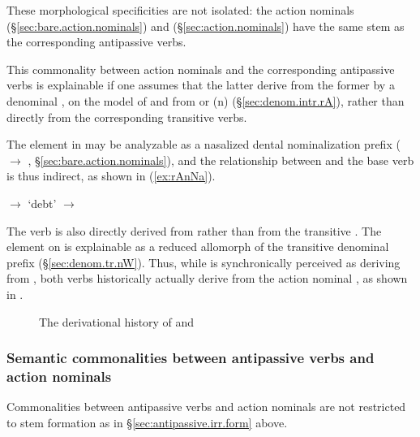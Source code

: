 These morphological specificities are not isolated: the action nominals   (§\ref{sec:bare.action.nominals}) and   (§\ref{sec:action.nominals}) have the same stem as the corresponding antipassive verbs.

This commonality between action nominals and the corresponding antipassive verbs is explainable if one assumes that the latter derive from the former by a denominal , on the model of   and   from  or  (n) (§\ref{sec:denom.intr.rA}), rather than directly from the corresponding transitive verbs.
 
The  element in  may be analyzable as a nasalized dental nominalization prefix ( $\rightarrow$ ,  §\ref{sec:bare.action.nominals}), and the relationship between  and the base verb  is thus indirect, as shown in (\ref{ex:rAnNa}).

\begin{exe}
\ex \label{ex:rAnNa}
\glt {} $\rightarrow$  `debt' $\rightarrow$ 
\end{exe}
  
The verb  is also directly derived from  rather than from the transitive . The  element on  is explainable as a reduced allomorph of the transitive denominal  prefix (§\ref{sec:denom.tr.nW}). Thus, while  is synchronically perceived as deriving from , both verbs historically actually derive from the action nominal , as shown in . 

   \begin{figure}
   \caption{The derivational history of  and   } \label{fig:ntsGe}  
\end{figure}


\subsubsection{Semantic commonalities between antipassive verbs and action nominals} \label{sec:antipassive.irr.semantic} 
Commonalities between antipassive verbs and action nominals are not restricted to stem formation as in  §\ref{sec:antipassive.irr.form}  above.

